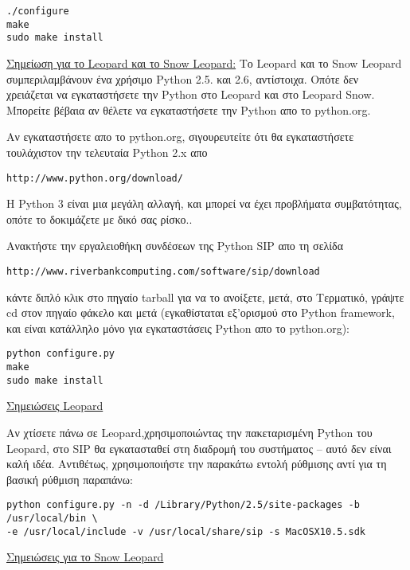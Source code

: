 \begin{verbatim}
./configure
make 
sudo make install 
\end{verbatim}

\underline{Σημείωση για το Leopard και το Snow Leopard:} Το Leopard και το Snow Leopard συμπεριλαμβάνουν ένα χρήσιμο Python 2.5. και 2.6, αντίστοιχα. Οπότε δεν χρειάζεται να εγκαταστήσετε την Python στο Leopard και στο Leopard Snow. Μπορείτε βέβαια αν θέλετε να εγκαταστήσετε την Python απο το python.org.

Αν εγκαταστήσετε απο το python.org, σιγουρευτείτε ότι θα εγκαταστήσετε τουλάχιστον την τελευταία  Python 2.x απο 

\begin{verbatim}
http://www.python.org/download/
\end{verbatim}

H Python 3 είναι μια μεγάλη αλλαγή, και μπορεί να έχει προβλήματα συμβατότητας, οπότε το δοκιμάζετε με δικό σας ρίσκο..

Ανακτήστε την εργαλειοθήκη συνδέσεων της Python SIP απο τη σελίδα

\begin{verbatim}
http://www.riverbankcomputing.com/software/sip/download
\end{verbatim}

κάντε διπλό κλικ στο πηγαίο tarball για να το ανοίξετε, μετά, στο Τερματικό, γράψτε cd στον πηγαίο φάκελο και μετά (εγκαθίσταται εξ'ορισμού στο Python framework, και είναι κατάλληλο μόνο για εγκαταστάσεις Python απο το python.org): 

\begin{verbatim}
python configure.py 
make 
sudo make install 
\end{verbatim}

\underline{Σημειώσεις Leopard}

Αν χτίσετε πάνω σε Leopard,χρησιμοποιώντας την πακεταρισμένη Python του Leopard, στο SIP θα εγκατασταθεί στη διαδρομή του συστήματος – αυτό δεν είναι καλή ιδέα. Αντιθέτως, χρησιμοποιήστε την παρακάτω εντολή ρύθμισης αντί για τη βασική ρύθμιση παραπάνω:

\begin{verbatim}
python configure.py -n -d /Library/Python/2.5/site-packages -b /usr/local/bin \
-e /usr/local/include -v /usr/local/share/sip -s MacOSX10.5.sdk
\end{verbatim}

\underline{Σημειώσεις για το Snow Leopard}


